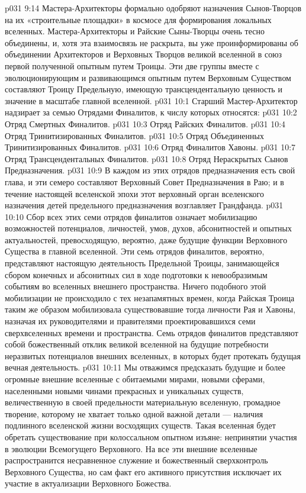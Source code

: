 \vs p031 9:14 Мастера\hyp{}Архитекторы формально одобряют назначения Сынов\hyp{}Творцов на их «строительные площадки» в космосе для формирования локальных вселенных. Мастера\hyp{}Архитекторы и Райские Сыны\hyp{}Творцы очень тесно объединены, и, хотя эта взаимосвязь не раскрыта, вы уже проинформированы об объединении Архитекторов и Верховных Творцов великой вселенной в союз первой полученной опытным путем Троицы. Эти две группы вместе с эволюционирующим и развивающимся опытным путем Верховным Существом составляют Троицу Предельную, имеющую трансцендентальную ценность и значение в масштабе главной вселенной.
\vs p031 10:1 Старший Мастер\hyp{}Архитектор надзирает за семью Отрядами Финалитов, к числу которых относятся:
\vs p031 10:2 \bibnobreakspace Отряд Смертных Финалитов.
\vs p031 10:3 \bibnobreakspace Отряд Райских Финалитов.
\vs p031 10:4 \bibnobreakspace Отряд Тринитизированных Финалитов.
\vs p031 10:5 \bibnobreakspace Отряд Объединенных Тринитизированных Финалитов.
\vs p031 10:6 \bibnobreakspace Отряд Финалитов Хавоны.
\vs p031 10:7 \bibnobreakspace Отряд Трансцендентальных Финалитов.
\vs p031 10:8 \bibnobreakspace Отряд Нераскрытых Сынов Предназначения.
\vs p031 10:9 В каждом из этих отрядов предназначения есть свой глава, и эти семеро составляют Верховный Совет Предназначения в Раю; и в течение настоящей вселенской эпохи этот верховный орган вселенского назначения детей предельного предназначения возглавляет Грандфанда.
\vs p031 10:10 Сбор всех этих семи отрядов финалитов означает мобилизацию возможностей потенциалов, личностей, умов, духов, абсонитностей и опытных актуальностей, превосходящую, вероятно, даже будущие функции Верховного Существа в главной вселенной. Эти семь отрядов финалитов, вероятно, представляют настоящую деятельность Предельной Троицы, занимающейся сбором конечных и абсонитных сил в ходе подготовки к невообразимым событиям во вселенных внешнего пространства. Ничего подобного этой мобилизации не происходило с тех незапамятных времен, когда Райская Троица таким же образом мобилизовала существовавшие тогда личности Рая и Хавоны, назначая их руководителями и правителями проектировавшихся семи сверхвселенных времени и пространства. Семь отрядов финалитов представляют собой божественный отклик великой вселенной на будущие потребности неразвитых потенциалов внешних вселенных, в которых будет протекать будущая вечная деятельность.
\vs p031 10:11 Мы отважимся предсказать будущие и более огромные внешние вселенные с обитаемыми мирами, новыми сферами, населенными новыми чинами прекрасных и уникальных существ, величественную в своей предельности материальную вселенную, громадное творение, которому не хватает только одной важной детали --- наличия подлинного  вселенской жизни восходящих существ. Такая вселенная будет обретать существование при колоссальном опытном изъяне: непринятии участия в эволюции Всемогущего Верховного. На все эти внешние вселенные распространится несравненное служение и божественный сверхконтроль Верховного Существа, но сам факт его активного присутствия исключает их участие в актуализации Верховного Божества.
